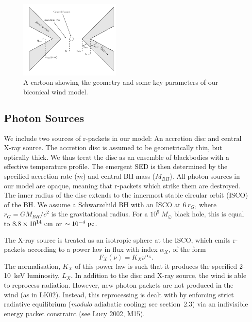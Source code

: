 \documentclass[useAMS,usenatbib]{mn2e_x}
\begin{document}
\begin{figure} 
\centering
\includegraphics[width=0.45\textwidth]{figures/fig2_cartoon.png}
\caption
{
A cartoon showing the geometry and some key parameters of
our biconical wind model.
}
\label{fig:cartoon}
\end{figure} 

\subsection{Photon Sources}
\label{sec:photon_sources}

We include two sources of r-packets in our model:
An accretion disc and central X-ray source.
The accretion disc is assumed to be geometrically thin, but optically thick.
We thus treat the disc as an ensemble of blackbodies with a 
\cite{shakurasunyaev1973} effective temperature profile. 
The emergent SED is then determined by the specified accretion rate ($\dot{m}$)
and central BH mass ($M_{BH}$).
All photon sources in our model are opaque, meaning
that r-packets which strike them are destroyed.
The inner radius of the disc extends to the innermost 
stable circular orbit (ISCO) of the BH. 
We assume a Schwarzchild BH with an ISCO at $6~r_G$, where 
$r_G = GM_{BH}/c^2$ is the gravitational radius.
For a $10^9~M_\odot$ black hole, this is equal to $8.8\times10^{14}~{\rm cm}$ 
or $\sim10^{-4}~{\rm pc}$.  


The X-ray source is treated as an isotropic sphere at the ISCO,
which emits r-packets according to a power law in flux with index $\alpha_X$, of the form
\begin{equation}
F_X (\nu) = K_X \nu^{\alpha_X}.
\end{equation}
The normalisation, $K_X$ of this power law is such that it 
produces the specified 2-10~keV luminosity, $L_X$.
In addition to the disc and X-ray source, 
the wind is able to reprocess radiation. However, new 
photon packets are not produced in the wind (as in LK02). 
Instead, this reprocessing is dealt with by enforcing strict
radiative equilibrium ({\em modulo} adiabatic cooling; see section~2.3)
via an indivisible energy packet
constraint (see Lucy 2002, M15).
\end{document}
